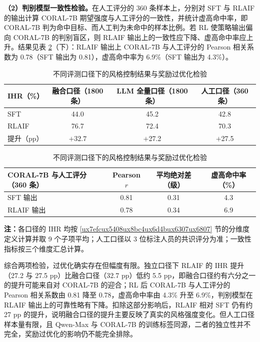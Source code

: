 \documentclass[fontset=fandol,type=master,campus=shenzhen,etitleauto=true]{hithesisbook}
\begin{document}
\textbf{（2）判别模型一致性检验。}在人工评分的 360 条样本上，分别对 SFT 与 RLAIF 的输出计算 CORAL-7B 期望强度与人工评分的一致性，并统计虚高命中率，即 CORAL-7B 判为命中目标、而人工判为未命中的样本比例。若 RL 使策略输出偏向 CORAL-7B 的判别盲区，则 RLAIF 输出上的一致性应下降、虚高命中率应上升。结果见表 \ref{tab:rm-overopt}（下）：RLAIF 输出上 CORAL-7B 与人工评分的 Pearson 相关系数为 0.78（SFT 输出为 0.81），虚高命中率为 6.9\%（SFT 输出为 4.3\%）。

\begin{table}[htbp]
\centering
\caption{不同评测口径下的风格控制结果与奖励过优化检验}
\label{tab:rm-overopt}
\small
\renewcommand{\arraystretch}{1.15}
\begin{tabular}{l c c c}
\toprule
\textbf{IHR（\%）} & \textbf{融合口径（1800 条）} & \textbf{LLM 全量口径（1800 条）} & \textbf{人工口径（360 条）} \\
\midrule
SFT & 44.0 & 45.2 & 42.8 \\
RLAIF & 76.7 & 72.4 & 70.3 \\
提升（pp） & $+32.7$ & $+$27.2 & $+$27.5 \\
\bottomrule
\end{tabular}

\vspace{0.3cm}
\begin{tabular}{l c c c}
\toprule
\textbf{CORAL-7B 与人工评分（360 条）} & \textbf{Pearson $r$} & \textbf{平均绝对差（级）} & \textbf{虚高命中率（\%）} \\
\midrule
SFT 输出 & 0.81 & 0.31 & 4.3 \\
RLAIF 输出 & 0.78 & 0.34 & 6.9 \\
\bottomrule
\end{tabular}

\vspace{0.2cm}
\parbox{\linewidth}{\small \textbf{注：}各口径的 IHR 均按 \ref{ux7efcux5408ux8bc4ux6d4bux6307ux6807} 节的分维度定义计算并取 9 个子项平均；人工口径以 3 位标注人员的共识评分为准；一致性指标按三个维度汇总计算。}
\end{table}

综合两项检验，过优化确实存在但幅度有限。独立口径下 RLAIF 的 IHR 提升（27.2 与 27.5 pp）比融合口径（32.7 pp）低约 5.5 pp，即融合口径约有六分之一的提升可能来自对 CORAL-7B 的迎合；RL 后 CORAL-7B 与人工评分的 Pearson 相关系数由 0.81 降至 0.78，虚高命中率由 4.3\% 升至 6.9\%，判别模型在 RLAIF 输出上的可靠性略有下降。扣除这部分影响后，RLAIF 相对 SFT 仍有约 27 pp 的提升，说明融合口径的提升主要反映了真实的风格强度变化。但人工口径样本量有限，且 Qwen-Max 与 CORAL-7B 的训练标签同源，二者的独立性并不完全，奖励过优化的影响仍不能完全排除。
\end{document}
